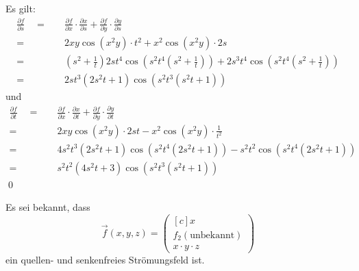 \documentclass[answers]{exam}
\newcommand{\vektor}[1]{\begin{pmatrix*}[c] #1 \end{pmatrix*}}
\begin{document}
\begin{questions}
\begin{parts}
\begin{solution}
            Es gilt:
            $$
                \begin{aligned}
                    \frac{\partial f}{\partial s} \quad = \quad & \frac{\partial f}{\partial x} \cdot \frac{\partial x}{\partial s} + \frac{\partial f}{\partial y} \cdot \frac{\partial y}{\partial s}                   \\
                    = \quad                                     & 2xy\cos(x^2y) \cdot t^2 + x^2\cos(x^2y) \cdot 2s                                                                                                        \\
                    = \quad                                     & \left(s^2 + \frac{1}{t}\right)2st^4\cos\left(s^2t^4\left(s^2 + \frac{1}{t}\right)\right) + 2s^3t^4\cos\left(s^2t^4\left(s^2 + \frac{1}{t}\right)\right) \\
                    = \quad                                     & 2st^3 \left( 2s^2t + 1 \right)\cos \left( s^2t^3\left( s^2t + 1 \right) \right)
                \end{aligned}
            $$
            und
            $$
                \begin{aligned}
                    \frac{\partial f}{\partial t} \quad = \quad & \frac{\partial f}{\partial x} \cdot \frac{\partial x}{\partial t} + \frac{\partial f}{\partial y} \cdot \frac{\partial y}{\partial t}     \\
                    = \quad                                     & 2xy\cos(x^2y) \cdot 2st -  x^2\cos(x^2y) \cdot \frac{1}{t^2}                                                                              \\
                    = \quad                                     & 4s^2t^3 \left( 2s^2t + 1 \right) \cos\left(s^2t^4\left( 2s^2t + 1 \right)\right) - s^2t^2 \cos\left(s^2t^4\left( 2s^2t + 1 \right)\right) \\
                    = \quad                                     & s^2t^2\left( 4s^2t + 3 \right) \cos \left( s^2t^3 \left(s^2t + 1\right) \right)
                \end{aligned}
            $$\qed
        \end{solution}
    \end{parts}

    \newpage
    \question
    Es sei bekannt, dass
    $$
        \vec{f}(x, y, z) = \vektor{x \\ f_2(\text{unbekannt}) \\ x\cdot y \cdot z}
    $$
    ein quellen- und senkenfreies Strömungsfeld ist.
    \begin{parts}

\end{parts}
\end{questions}
\end{document}
